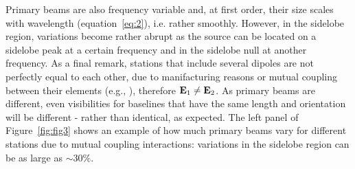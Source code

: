 \begin{itemize}
Primary beams are also frequency variable and, at first order, their size scales with wavelength (equation~\ref{eq:2}), i.e. rather smoothly. However, in the sidelobe region, variations become rather abrupt as the source can be located on a sidelobe peak at a certain frequency and in the sidelobe null at another frequency. As a final remark, stations that include several dipoles are not perfectly equal to each other, due to manifacturing reasons or mutual coupling between their elements (e.g., \cite{sokolowski17}), therefore ${\bf E}_1 \neq {\bf E}_2$. As primary beams are different, even visibilities for baselines that have the same length and orientation will be different - rather than identical, as expected. The left panel of Figure~\ref{fig:fig3} shows an example of how much primary beams vary for different stations due to mutual coupling interactions: variations in the sidelobe region can be as large as $\sim 30\%$.


\end{itemize}
